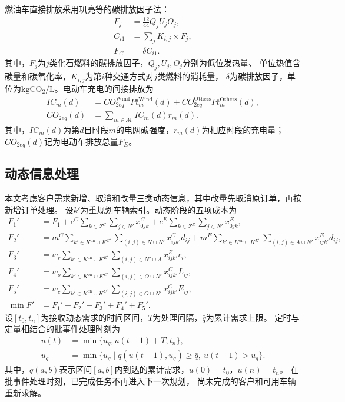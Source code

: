 燃油车直接排放采用巩亮等\cite{ref:95}的碳排放因子法：
\begin{align}
F_j&=\frac{12}{44}Q_jU_jO_j,
\label{eq:gong-factor}\\
C_{i1}&=\sum_j K_{i,j}\times F_j,
\label{eq:gong-direct}\\
F_C&=\delta C_{i1}.
\label{eq:gong-fc}
\end{align}
其中，$F_j$为$j$类化石燃料的碳排放因子，$Q_j,U_j,O_j$分别为低位发热量、
单位热值含碳量和碳氧化率，$K_{i,j}$为第$i$种交通方式对$j$类燃料的消耗量，
$\delta$为碳排放因子，单位为$\mathrm{kgCO_2/L}$。电动车充电的间接排放为\cite{ref:96}
\begin{align}
IC_m(d)&=CO_{2eq}^{\mathrm{Wind}}Pt_m^{\mathrm{Wind}}(d)
+CO_{2eq}^{\mathrm{Others}}Pt_m^{\mathrm{Others}}(d),
\label{eq:deng-intensity}\\
CO_{2eq}(d)&=\sum_{m\in \mathcal M}IC_m(d)r_m(d).
\label{eq:deng-emission}
\end{align}
其中，$IC_m(d)$为第$d$日时段$m$的电网碳强度，$r_m(d)$为相应时段的充电量；
$CO_{2eq}(d)$记为电动车排放总量$F_E$。

\subsection{动态信息处理}
\label{sec:dynamic-demand-model}

本文考虑客户需求新增、取消和改量三类动态信息，其中改量先取消原订单，再按新增订单处理。
设$k'$为重规划车辆索引。动态阶段的五项成本为\cite{ref:71}
\begin{align}
F_1'&=F_1+c^C\sum_{k\in Z^C}\sum_{j\in N'}x_{0jk}^C
+c^E\sum_{k\in Z^E}\sum_{j\in N'}x_{0jk}^E,
\label{eq:qiu-dyn-f1}\\
F_2'&=m^C\sum_{k'\in K^{\mathrm{on}}\cup K^{C'}}\sum_{(i,j)\in N\cup N'}x_{ijk'}^Cd_{ij}
+m^E\sum_{k'\in K^{\mathrm{on}}\cup K^{E'}}\sum_{(i,j)\in A\cup N'}x_{ijk'}^Ed_{ij},
\label{eq:qiu-dyn-f2}\\
F_3'&=w_r\sum_{k'\in K^{\mathrm{on}}\cup K^{E'}}\sum_{(i,j)\in N'\cup A}x_{ijk'}^Er_i,
\label{eq:qiu-dyn-f3}\\
F_4'&=w_o\sum_{k'\in K^{\mathrm{on}}\cup K^{C'}}\sum_{(i,j)\in O\cup N'}x_{ijk'}^CL_{ij},
\label{eq:qiu-dyn-f4}\\
F_5'&=w_c\sum_{k'\in K^{\mathrm{on}}\cup K^{C'}}\sum_{(i,j)\in O\cup N'}x_{ijk'}^CE_{ij},
\label{eq:qiu-dyn-f5}\\
\min F'&=F_1'+F_2'+F_3'+F_4'+F_5'.
\label{eq:qiu-dyn-obj}
\end{align}
设$[t_0,t_n]$为接收动态需求的时间区间，$T$为处理间隔，$\bar q$为累计需求上限。
定时与定量相结合的批事件处理时刻为
\begin{align}
u(t)&=\min\{u_q,u(t-1)+T,t_n\},
\label{eq:qiu-trigger-time}\\
u_q&=\min\{u_q\mid q(u(t-1),u_q)\ge\bar q,\ u(t-1)>u_q\}.
\label{eq:qiu-trigger-quantity}
\end{align}
其中，$q(a,b)$表示区间$[a,b]$内到达的累计需求，$u(0)=t_0$，$u(n)=t_n$。
在批事件处理时刻，已完成任务不再进入下一次规划，
尚未完成的客户和可用车辆重新求解。

